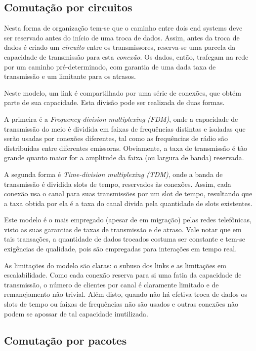 \subsection{Comutação por circuitos}

Nesta forma de organização tem-se que o caminho entre dois end systems deve ser reservado antes do início de uma troca de dados.
Assim, antes da troca de dados é criado um \emph{circuito} entre os transmissores, reserva-se uma parcela da capacidade de transmissão para esta \emph{conexão}.
Os dados, então, trafegam na rede por um caminho pré-determinado, com garantia de uma dada taxa de transmissão e um limitante para os atrasos.

Neste modelo, um link é compartilhado por uma série de conexões, que obtém parte de sua capacidade.
Esta divisão pode ser realizada de duas formas.

A primeira é a \emph{Frequency-division multiplexing (FDM)}, onde a capacidade de transmissão do meio é dividida em faixas de frequências distintas e isoladas que serão usadas por conexões diferentes, tal como as frequências de rádio são distribuídas entre diferentes emissoras.
Obviamente, a taxa de transmissão é tão grande quanto maior for a amplitude da faixa (ou largura de banda) reservada.

A segunda forma é \emph{Time-division multiplexing (TDM)}, onde a banda de transmissão é dividida slots de tempo, reservados às conexões.
Assim, cada conexão usa o canal para suas transmissões por um slot de tempo, resultando que a taxa obtida por ela é a taxa do canal divida pela quantidade de slots existentes.

Este modelo é o mais empregado (apesar de em migração) pelas redes telefônicas, visto as suas garantias de taxas de transmissão e de atraso.
Vale notar que em tais transações, a quantidade de dados trocados costuma ser constante e tem-se exigências de qualidade, pois são empregadas para interações em tempo real.

As limitações do modelo são claras: o subuso dos links e as limitações em escalabilidade.
Como cada conexão reserva para si uma fatia da capacidade de transmissão, o número de clientes por canal é claramente limitado e de remanejamento não trivial.
Além disto, quando não há efetiva troca de dados os slots de tempo ou faixas de frequências não são usados e outras conexões não podem se apossar de tal capacidade inutilizada.

\subsection{Comutação por pacotes}

